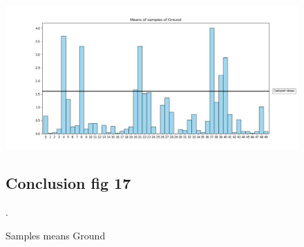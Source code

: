 \documentclass{article}
\begin{document}
\begin{figure}[!hbt]
\includegraphics[width=1.3\linewidth,height=0.500\textheight]{Samples_Ground.png}
\caption{Samples means Ground   }
\label{fig17:}
\subsection{Conclusion fig 17}
.
\end{figure}





\end{document}
